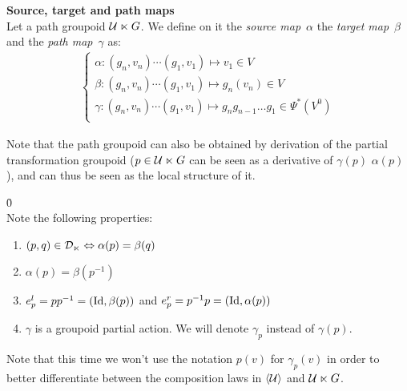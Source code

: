 \begin{definition}\textbf{Source, target and path maps}\\
Let a path groupoid $\mathcal{U} \ltimes G$. We define on it the \emph{source map}~$\alpha$ the \emph{target map}~$\beta$ and the \emph{path map}~$\gamma$ as:
\begin{gather*}
\begin{cases}
  \alpha: (g_n,v_n) \cdots (g_1,v_1) \mapsto v_1 \in V\\
  \beta: (g_n,v_n) \cdots (g_1,v_1) \mapsto g_n(v_n) \in V\\
  \gamma: (g_n,v_n) \cdots (g_1,v_1) \mapsto g_ng_{n-1}\ldots g_1 \in \Psi^*(V^0)\\
\end{cases}
\end{gather*}
\end{definition}

\begin{remark}Note that the path groupoid can also be obtained by derivation of the partial transformation groupoid (\ie $p \in \mathcal{U} \ltimes G$ can be seen as a derivative of $\gamma(p)$ \wrt $\alpha(p)$), and can thus be seen as the local structure of it.
\end{remark}

\begin{lemma}\h{0}\\
Note the following properties:
\begin{enumerate}
  \item $(p,q) \in \mathcal{D}_{\ltimes} \Leftrightarrow \alpha(p) = \beta(q)$
  \item $\alpha(p) = \beta(p^{-1})$
  \item $e^l_p=pp^{-1} = (\operatorname{Id}, \beta(p))$ and $e^r_p=p^{-1}p = (\operatorname{Id}, \alpha(p))$
  \item $\gamma$ is a groupoid partial action. We will denote $\gamma_p$ instead of $\gamma(p)$. \label{enum:3}
\end{enumerate}
\end{lemma}

\begin{remark}
Note that this time we won't use the notation $p(v)$ for $\gamma_p(v)$ in order to better differentiate between the composition laws in $\langle \mathcal{U} \rangle$ and $\mathcal{U} \ltimes G$.
\end{remark}

